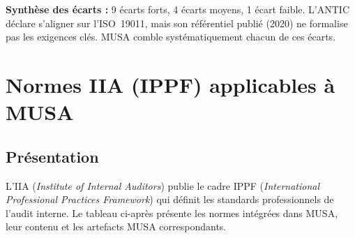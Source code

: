 \documentclass[12pt,a4paper,oneside]{report}
\begin{document}
\vspace{0.5cm}
\begin{encadre}
\textbf{Synthèse des écarts :} 9 écarts forts, 4 écarts moyens, 1 écart faible.
L'ANTIC déclare s'aligner sur l'ISO~19011, mais son référentiel publié (2020) ne
formalise pas les exigences clés. MUSA comble systématiquement chacun de ces écarts.
\end{encadre}

\newpage

\chapter{Normes IIA (IPPF) applicables à MUSA}
\label{annexe:iia}

\section*{Présentation}

L'IIA (\textit{Institute of Internal Auditors}) publie le cadre IPPF
(\textit{International Professional Practices Framework}) qui définit les
standards professionnels de l'audit interne. Le tableau ci-après présente
les normes intégrées dans MUSA, leur contenu et les artefacts MUSA
correspondants.
\end{document}
